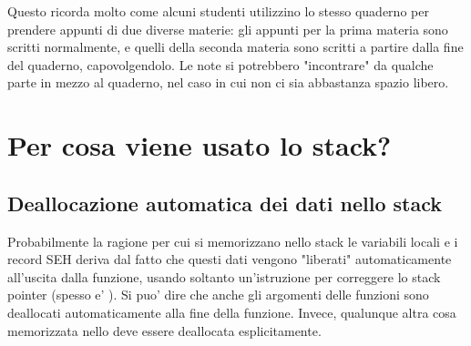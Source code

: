 Questo ricorda molto come alcuni studenti utilizzino lo stesso quaderno per prendere appunti di due diverse materie:
gli appunti per la prima materia sono scritti normalmente, e quelli della seconda materia sono scritti a partire dalla fine del quaderno, capovolgendolo.
Le note si potrebbero "incontrare" da qualche parte in mezzo al quaderno, nel caso in cui non ci sia abbastanza spazio libero.


\section{Per cosa viene usato lo stack?}



\EN{}
\RU{}
\PTBR{}




\subsection{Deallocazione automatica dei dati nello stack}

Probabilmente la ragione per cui si memorizzano nello stack le variabili locali e i record SEH deriva dal fatto che questi dati vengono "liberati" automaticamente all'uscita dalla funzione,
usando soltanto un'istruzione per correggere lo stack pointer (spesso e' \ADD).
Si puo' dire che anche gli argomenti delle funzioni sono deallocati automaticamente alla fine della funzione.
Invece, qualunque altra cosa memorizzata nello  deve essere deallocata esplicitamente.

\EN{}
\RU{}
\PTBR{}


